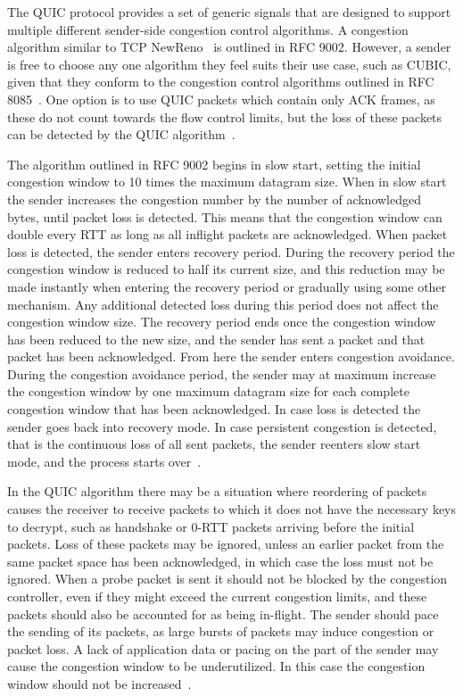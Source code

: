 \documentclass[english, 12pt, a4paper, elec, utf8, a-2b, online]{aaltothesis}
\begin{document}
The QUIC protocol provides a set of generic signals that are designed to support
multiple different sender-side congestion control algorithms. A congestion algorithm similar
to TCP NewReno~\cite{rfc6582} is outlined in RFC 9002. However, a sender is free to
choose any one algorithm they feel suits their use case, such as CUBIC, given that they conform
to the congestion control algorithms outlined in RFC 8085~\cite{rfc8085}. One option
is to use QUIC packets which contain only ACK frames, as these do not count towards
the flow control limits, but the loss of these packets can be detected by the QUIC
algorithm~\cite{rfc9002}.

The algorithm outlined in RFC 9002 begins in slow start, setting the initial congestion
window to 10 times the maximum datagram size. When in slow start the sender increases
the congestion number by the number of acknowledged bytes, until packet loss is detected. This
means that the congestion window can double every RTT as long as all inflight packets
are acknowledged. When packet loss is detected, the sender enters recovery period.
During the recovery period the congestion window is reduced to half its current
size, and this reduction may be made instantly when entering the recovery period
or gradually using some other mechanism. Any additional detected loss during this
period does not affect the congestion window size. The recovery period ends once
the congestion window has been reduced to the new size, and the sender has sent
a packet and that packet has been acknowledged. From here the sender enters congestion 
avoidance. During the congestion avoidance period, the sender may at maximum increase
the congestion window by one maximum datagram size for each complete congestion
window that has been acknowledged. In case loss is detected the sender goes back
into recovery mode. In case persistent congestion is detected, that is the continuous
loss of all sent packets, the sender reenters slow start mode, and the process
starts over~\cite{rfc9002}.

In the QUIC algorithm there may be a situation where reordering of packets causes
the receiver to receive packets to which it does not have the necessary keys to
decrypt, such as handshake or 0-RTT packets arriving before the initial packets.
Loss of these packets may be ignored, unless an earlier packet from the same packet space
has been acknowledged, in which case the loss must not be ignored. When a probe
packet is sent it should not be blocked by the congestion controller, even if they might exceed the current
congestion limits, and these packets should also be accounted for as being in-flight. The
sender should pace the sending of its packets, as large bursts of packets may induce 
congestion or packet loss. A lack of application data or pacing on the part of the
sender may cause the congestion window to be underutilized. In this case the congestion
window should not be increased~\cite{rfc9002}.
\end{document}
